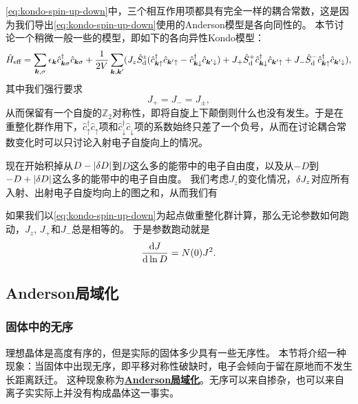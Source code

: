 \documentclass[hyperref, UTF8, a4paper]{ctexart}
\newcommand*{\concept}[1]{\underline{\textbf{#1}}}
\begin{document}
\eqref{eq:kondo-spin-up-down}中，三个相互作用项都具有完全一样的耦合常数，这是因为我们导出\eqref{eq:kondo-spin-up-down}使用的Anderson模型是各向同性的。
本节讨论一个稍微一般一些的模型，即如下的各向异性Kondo模型：
\begin{equation}
    \hat{H}_\text{eff} = \sum_{\vb*{k}, \sigma} \epsilon_{\vb*{k}} \hat{c}^\dagger_{\vb*{k} \sigma} \hat{c}_{\vb*{k} \sigma} + \frac{1}{2V} \sum_{\vb*{k}, \vb*{k}'} (
        J_z \hat{S}_\text{d}^z (\hat{c}^\dagger_{\vb*{k} \uparrow} \hat{c}_{\vb*{k}' \uparrow} - \hat{c}^\dagger_{\vb*{k} \downarrow} \hat{c}_{\vb*{k}' \downarrow})
        + J_+ \hat{S}^+_\text{d} \hat{c}^\dagger_{\vb*{k} \downarrow} \hat{c}_{\vb*{k}' \uparrow}
        + J_- \hat{S}^-_\text{d} \hat{c}^\dagger_{\vb*{k} \uparrow} \hat{c}_{\vb*{k}' \downarrow}
    ),
\end{equation}
其中我们强行要求
\begin{equation}
    J_+ = J_- = J_\pm,
\end{equation}
从而保留有一个自旋的$\mathbb{Z}_2$对称性，即将自旋上下颠倒则什么也没有发生。于是在重整化群作用下，$\hat{c}^\dagger_\uparrow \hat{c}_\uparrow$项和$\hat{c}^\dagger_\downarrow \hat{c}_\downarrow$项的系数始终只差了一个负号，从而在讨论耦合常数变化时可以只讨论入射电子自旋向上的情况。

现在开始积掉从$D-\abs{\var{D}}$到$D$这么多的能带中的电子自由度，以及从$-D$到$-D+\abs{\var{D}}$这么多的能带中的电子自由度。
我们考虑$J_z$的变化情况，$\var{J_z}$对应所有入射、出射电子自旋均向上的图之和，从而我们有


如果我们以\eqref{eq:kondo-spin-up-down}为起点做重整化群计算，那么无论参数如何跑动，$J_z$, $J_+$和$J_-$总是相等的。
于是参数跑动就是
\begin{equation}
    \dv{J}{\ln D} = N(0) J^2.
\end{equation}

\subsection{Anderson局域化}

\subsubsection{固体中的无序}

理想晶体是高度有序的，但是实际的固体多少具有一些无序性。
本节将介绍一种现象：当固体中出现无序，即平移对称性破缺时，电子会倾向于留在原地而不发生长距离跃迁。
这种现象称为\concept{Anderson局域化}。无序可以来自掺杂，也可以来自离子实实际上并没有构成晶体这一事实。
\end{document}

